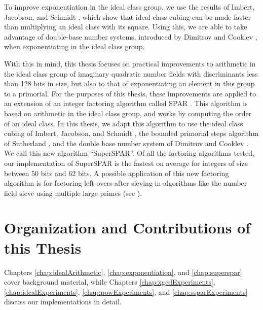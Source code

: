 \documentclass{ucalgthes1}
\theoremstyle{definition}
\begin{document}
To improve exponentiation in the ideal class group, we use the results of Imbert, Jacobson, and Schmidt \cite{Imbert2010}, which show that ideal class cubing can be made faster than multiplying an ideal class with its square.  Using this, we are able to take advantage of double-base number systems, introduced by Dimitrov and Cooklev \cite{Dimitrov1995a, Dimitrov1995b}, when exponentiating in the ideal class group.  

With this in mind, this thesis focuses on practical improvements to arithmetic in the ideal class group of imaginary quadratic number fields with discriminants less than 128 bits in size, but also to that of exponentiating an element in this group to a primorial.  For the purposes of this thesis, these improvements are applied to an extension of an integer factoring algorithm called SPAR \cite{Schnorr1984}.  This algorithm is based on arithmetic in the ideal class group, and works by computing the order of an ideal class.  In this thesis, we adapt this algorithm to use the ideal class cubing of Imbert, Jacobson, and Schmidt \cite{Imbert2010}, the bounded primorial steps algorithm of Sutherland \cite{Sutherland2007}, and the double base number system of Dimitrov and Cooklev \cite{Dimitrov1995a, Dimitrov1995b}.  We call this new algorithm ``SuperSPAR''.  Of all the factoring algorithms tested, our implementation of SuperSPAR is the fastest on average for integers of size between 50 bits and 62 bits.  A possible application of this new factoring algorithm is for factoring left overs after sieving in algorithms like the number field sieve using multiple large primes (see \cite[\S 6.1.4]{Crandall2001}).


\section{Organization and Contributions of this Thesis}

Chapters \ref{chap:idealArithmetic}, \ref{chap:exponentiation}, and \ref{chap:superspar} cover background material, while Chapters \ref{chap:xgcdExperiments}, \ref{chap:idealExperiments}, \ref{chap:powExperiments}, and \ref{chap:ssparExperiments} discuss our implementations in detail.
\end{document}
